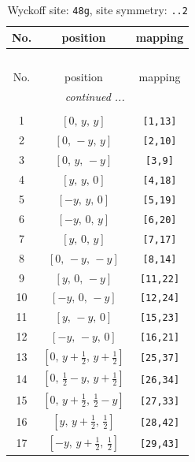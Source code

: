 \documentclass[fleqn,8pt]{jsarticle}
\begin{document}
\begin{longtable}{ccc}
\caption{Wyckoff site: {\tt 48g}, site symmetry: {\tt ..2}}
 \\
 \hline \hline
No. & position & mapping \\ \hline \endfirsthead

\multicolumn{2}{l}{\tablename\ \thetable{}} \\
 \hline \hline
No. & position & mapping \\ \hline \endhead

 \hline \hline
\multicolumn{2}{r}{\footnotesize\it continued ...} \\ \endfoot

 \hline \hline
\multicolumn{2}{r}{} \\ \endlastfoot

1 & $\left[ 0,\, y,\, y \right]$ & {\tt [1,13]} \\ \hline
2 & $\left[ 0,\, - y,\, y \right]$ & {\tt [2,10]} \\ \hline
3 & $\left[ 0,\, y,\, - y \right]$ & {\tt [3,9]} \\ \hline
4 & $\left[ y,\, y,\, 0 \right]$ & {\tt [4,18]} \\ \hline
5 & $\left[ - y,\, y,\, 0 \right]$ & {\tt [5,19]} \\ \hline
6 & $\left[ - y,\, 0,\, y \right]$ & {\tt [6,20]} \\ \hline
7 & $\left[ y,\, 0,\, y \right]$ & {\tt [7,17]} \\ \hline
8 & $\left[ 0,\, - y,\, - y \right]$ & {\tt [8,14]} \\ \hline
9 & $\left[ y,\, 0,\, - y \right]$ & {\tt [11,22]} \\ \hline
10 & $\left[ - y,\, 0,\, - y \right]$ & {\tt [12,24]} \\ \hline
11 & $\left[ y,\, - y,\, 0 \right]$ & {\tt [15,23]} \\ \hline
12 & $\left[ - y,\, - y,\, 0 \right]$ & {\tt [16,21]} \\ \hline
13 & $\left[ 0,\, y + \frac{1}{2},\, y + \frac{1}{2} \right]$ & {\tt [25,37]} \\ \hline
14 & $\left[ 0,\, \frac{1}{2} - y,\, y + \frac{1}{2} \right]$ & {\tt [26,34]} \\ \hline
15 & $\left[ 0,\, y + \frac{1}{2},\, \frac{1}{2} - y \right]$ & {\tt [27,33]} \\ \hline
16 & $\left[ y,\, y + \frac{1}{2},\, \frac{1}{2} \right]$ & {\tt [28,42]} \\ \hline
17 & $\left[ - y,\, y + \frac{1}{2},\, \frac{1}{2} \right]$ & {\tt [29,43]} \\ \hline

\end{longtable}
\end{document}
